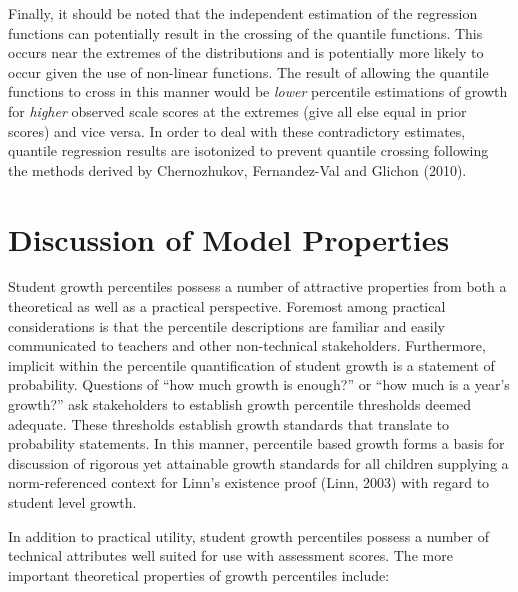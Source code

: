 \documentclass[12pt]{article}
\begin{document}
Finally, it should be noted that the independent estimation of the
regression functions can potentially result in the crossing of the
quantile functions. This occurs near the extremes of the distributions
and is potentially more likely to occur given the use of non-linear
functions. The result of allowing the quantile functions to cross in
this manner would be \emph{lower} percentile estimations of growth for
\emph{higher} observed scale scores at the extremes (give all else equal
in prior scores) and vice versa. In order to deal with these
contradictory estimates, quantile regression results are isotonized to
prevent quantile crossing following the methods derived by Chernozhukov,
Fernandez-Val and Glichon (2010).

\pagebreak

\section{Discussion of Model
Properties}\label{discussion-of-model-properties}

Student growth percentiles possess a number of attractive properties
from both a theoretical as well as a practical perspective. Foremost
among practical considerations is that the percentile descriptions are
familiar and easily communicated to teachers and other non-technical
stakeholders. Furthermore, implicit within the percentile quantification
of student growth is a statement of probability. Questions of ``how much
growth is enough?'' or ``how much is a year's growth?'' ask stakeholders
to establish growth percentile thresholds deemed adequate. These
thresholds establish growth standards that translate to probability
statements. In this manner, percentile based growth forms a basis for
discussion of rigorous yet attainable growth standards for all children
supplying a norm-referenced context for Linn's existence proof (Linn,
2003) with regard to student level growth.

In addition to practical utility, student growth percentiles possess a
number of technical attributes well suited for use with assessment
scores. The more important theoretical properties of growth percentiles
include:
\end{document}

